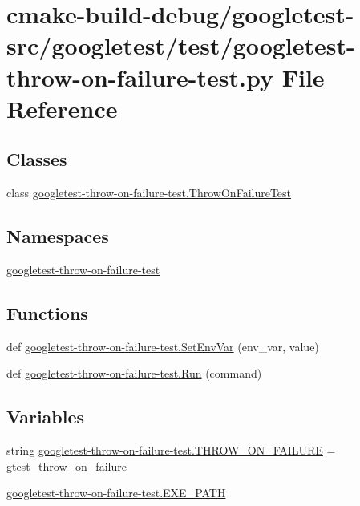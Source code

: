 \hypertarget{googletest-throw-on-failure-test_8py}{}\section{cmake-\/build-\/debug/googletest-\/src/googletest/test/googletest-\/throw-\/on-\/failure-\/test.py File Reference}
\label{googletest-throw-on-failure-test_8py}
\subsection*{Classes}
\begin{DoxyCompactItemize}
\item 
class \mbox{\hyperlink{classgoogletest-throw-on-failure-test_1_1ThrowOnFailureTest}{googletest-\/throw-\/on-\/failure-\/test.\+Throw\+On\+Failure\+Test}}
\end{DoxyCompactItemize}
\subsection*{Namespaces}
\begin{DoxyCompactItemize}
\item 
 \mbox{\hyperlink{namespacegoogletest-throw-on-failure-test}{googletest-\/throw-\/on-\/failure-\/test}}
\end{DoxyCompactItemize}
\subsection*{Functions}
\begin{DoxyCompactItemize}
\item 
def \mbox{\hyperlink{namespacegoogletest-throw-on-failure-test_a2e2bb374a68e4ae1db7c359b8005cbcc}{googletest-\/throw-\/on-\/failure-\/test.\+Set\+Env\+Var}} (env\+\_\+var, value)
\item 
def \mbox{\hyperlink{namespacegoogletest-throw-on-failure-test_a937ab7ba6dcd93d71b1997f2bbfe3804}{googletest-\/throw-\/on-\/failure-\/test.\+Run}} (command)
\end{DoxyCompactItemize}
\subsection*{Variables}
\begin{DoxyCompactItemize}
\item 
string \mbox{\hyperlink{namespacegoogletest-throw-on-failure-test_a7c90464af153ebb6f0e221d66dbc71f1}{googletest-\/throw-\/on-\/failure-\/test.\+T\+H\+R\+O\+W\+\_\+\+O\+N\+\_\+\+F\+A\+I\+L\+U\+RE}} = \textquotesingle{}gtest\+\_\+throw\+\_\+on\+\_\+failure\textquotesingle{}
\item 
\mbox{\hyperlink{namespacegoogletest-throw-on-failure-test_a9cf7f6bcb466c8346b1aacec917a09c1}{googletest-\/throw-\/on-\/failure-\/test.\+E\+X\+E\+\_\+\+P\+A\+TH}}
\end{DoxyCompactItemize}
